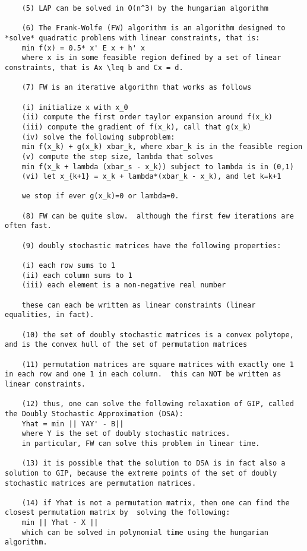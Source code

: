 \begin{verbatim}
	(5) LAP can be solved in O(n^3) by the hungarian algorithm

	(6) The Frank-Wolfe (FW) algorithm is an algorithm designed to *solve* quadratic problems with linear constraints, that is:
	min f(x) = 0.5* x' E x + h' x
	where x is in some feasible region defined by a set of linear constraints, that is Ax \leq b and Cx = d.

	(7) FW is an iterative algorithm that works as follows

	(i) initialize x with x_0
	(ii) compute the first order taylor expansion around f(x_k)
	(iii) compute the gradient of f(x_k), call that g(x_k)
	(iv) solve the following subproblem:
	min f(x_k) + g(x_k) xbar_k, where xbar_k is in the feasible region
	(v) compute the step size, lambda that solves
	min f(x_k + lambda (xbar_s - x_k)) subject to lambda is in (0,1)
	(vi) let x_{k+1} = x_k + lambda*(xbar_k - x_k), and let k=k+1

	we stop if ever g(x_k)=0 or lambda=0.

	(8) FW can be quite slow.  although the first few iterations are often fast.

	(9) doubly stochastic matrices have the following properties:

	(i) each row sums to 1
	(ii) each column sums to 1
	(iii) each element is a non-negative real number

	these can each be written as linear constraints (linear equalities, in fact).

	(10) the set of doubly stochastic matrices is a convex polytope, and is the convex hull of the set of permutation matrices

	(11) permutation matrices are square matrices with exactly one 1 in each row and one 1 in each column.  this can NOT be written as linear constraints.

	(12) thus, one can solve the following relaxation of GIP, called the Doubly Stochastic Approximation (DSA): 
	Yhat = min || YAY' - B||
	where Y is the set of doubly stochastic matrices.
	in particular, FW can solve this problem in linear time.

	(13) it is possible that the solution to DSA is in fact also a solution to GIP, because the extreme points of the set of doubly stochastic matrices are permutation matrices.

	(14) if Yhat is not a permutation matrix, then one can find the closest permutation matrix by  solving the following:
	min || Yhat - X ||
	which can be solved in polynomial time using the hungarian algorithm.  


\end{verbatim}
